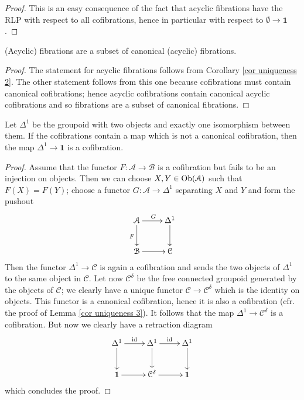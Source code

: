 \begin{refsection}
\begin{proof}
This is an easy consequence of the fact that acyclic fibrations have the RLP with respect to all cofibrations, hence in particular with respect to $\emptyset \to \mathbf 1$.
\end{proof}

\begin{cor} \label{cor uniqueness 3}
(Acyclic) fibrations are a subset of canonical (acyclic) fibrations.
\end{cor}

\begin{proof}
The statement for acyclic fibrations follows from Corollary \ref{cor uniqueness 2}. The other statement follows from this one because cofibrations must contain canonical cofibrations; hence acyclic cofibrations contain canonical acyclic cofibrations and so fibrations are a subset of canonical fibrations.
\end{proof}

\begin{lemma} \label{lemma uniqueness 4}
Let $\Delta^1$ be the groupoid with two objects and exactly one isomorphism between them. If the cofibrations contain a map which is not a canonical cofibration, then the map $\Delta^1 \to \mathbf 1$ is a cofibration.
\end{lemma}

\begin{proof}
Assume that the functor $F \colon \mathcal A \to \mathcal B$ is a cofibration but fails to be an injection on objects. Then we can choose $X,Y \in \operatorname{Ob}(\mathcal A)$ such that $F(X) = F(Y)$; choose a functor $G \colon \mathcal A \to \Delta^1$ separating $X$ and $Y$ and form the pushout
\[
\xymatrix{
\mathcal A \ar[d]_F \ar[r]^G & \Delta^1 \ar[d] \\ \mathcal B \ar[r] & \mathcal C
}
\]
Then the functor $\Delta^1 \to \mathcal C$ is again a cofibration and sends the two objects of $\Delta^1$ to the same object in $\mathcal C$. Let now $\mathcal C^\delta$ be the free connected groupoid generated by the objects of $\mathcal C$; we clearly have a unique functor $\mathcal C \to \mathcal C^\delta$ which is the identity on objects. This functor is a canonical cofibration, hence it is also a cofibration (cfr. the proof of Lemma \ref{cor uniqueness 3}). It follows that the map $\Delta^1 \to \mathcal C^\delta$ is a cofibration. But now we clearly have a retraction diagram
\[
\xymatrix{
\Delta^1 \ar[r]^{\mathrm{id}} \ar[d] & \Delta^1 \ar[r]^{\mathrm{id}} \ar[d] & \Delta^1 \ar[d] \\ \mathbf 1 \ar[r] & \mathcal C^\delta \ar[r] & \mathbf 1
}
\]
which concludes the proof.
\end{proof}


\end{refsection}
